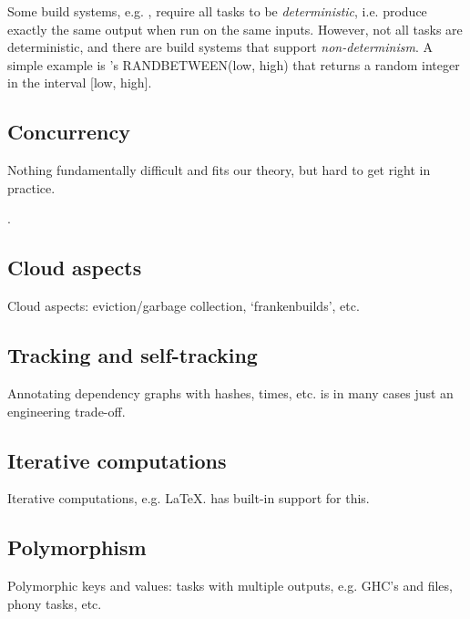 Some build systems, e.g. \Buck, require all tasks to be
\emph{deterministic}, i.e. produce exactly the same output when run on the
same inputs. However, not all tasks are deterministic, and there are build
systems that support \emph{non-determinism}. A simple example is \Excel's
\textsf{RANDBETWEEN(low, high)} that returns a random integer in the
interval \textsf{[low, high]}.

\subsection{Concurrency}\label{sec-concurrency}

Nothing fundamentally difficult and fits our theory, but hard to get right in
practice.

.

\subsection{Cloud aspects}\label{sec-cloud-aspects}

Cloud aspects: eviction/garbage collection, `frankenbuilds', etc.


\subsection{Tracking and self-tracking}\label{sec-tracking-aspects}

Annotating dependency graphs with hashes, times, etc. is in many cases just an
engineering trade-off.



\subsection{Iterative computations}\label{sec-iterative-compute}

Iterative computations, e.g. LaTeX. \Excel has built-in support for this.


\subsection{Polymorphism}\label{sec-polymorphism}

Polymorphic keys and values: tasks with multiple outputs, e.g. GHC's 
and  files, phony tasks, etc.


